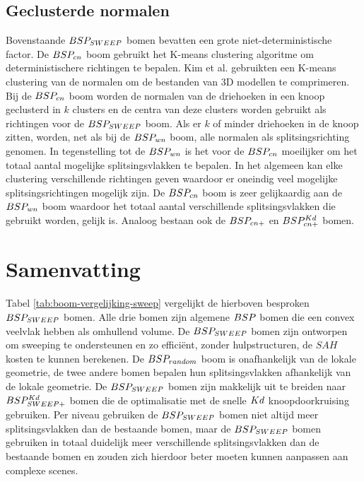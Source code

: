 
    

    
\subsection{Geclusterde normalen}
    Bovenstaande $BSP_{SWEEP}$ bomen bevatten een grote niet-deterministische factor.
    De $BSP_{cn}$ boom gebruikt het K-means clustering algoritme om deterministischere richtingen te bepalen.
    Kim et al. \cite{kim2002compression} gebruikten een K-means clustering van de normalen om de bestanden van 3D modellen te comprimeren.
    Bij de $BSP_{cn}$ boom worden de normalen van de driehoeken in een knoop geclusterd in $k$ clusters en de centra van deze clusters worden gebruikt als richtingen voor de $BSP_{SWEEP}$ boom.
    Als er $k$ of minder driehoeken in de knoop zitten, worden, net als bij de $BSP_{wn}$ boom, alle normalen als splitsingsrichting genomen.
    In tegenstelling tot de $BSP_{wn}$ is het voor de $BSP_{cn}$ moeilijker om het totaal aantal mogelijke splitsingsvlakken te bepalen.
    In het algemeen kan elke clustering verschillende richtingen geven waardoor er oneindig veel mogelijke splitsingsrichtingen mogelijk zijn.
    De $BSP_{cn}$ boom is zeer gelijkaardig aan de $BSP_{wn}$ boom waardoor het totaal aantal verschillende splitsingsvlakken die gebruikt worden, gelijk is. Analoog bestaan ook de $BSP_{cn+}$ en $BSP^{Kd}_{cn+}$ bomen.


\section{Samenvatting}
Tabel \ref{tab:boom-vergelijking-sweep} vergelijkt de hierboven besproken $BSP_{SWEEP}$ bomen.
Alle drie bomen zijn algemene $BSP$ bomen die een convex veelvlak hebben als omhullend volume.
De $BSP_{SWEEP}$ bomen zijn ontworpen om sweeping te ondersteunen en zo efficiënt, zonder hulpstructuren, de $SAH$ kosten te kunnen berekenen.
De $BSP_{random}$ boom is onafhankelijk van de lokale geometrie, de twee andere bomen bepalen hun splitsingsvlakken afhankelijk van de lokale geometrie.
De $BSP_{SWEEP}$ bomen zijn makkelijk uit te breiden naar $BSP^{Kd}_{SWEEP+}$ bomen die de optimalisatie met de snelle $Kd$ knoopdoorkruising gebruiken.
Per niveau gebruiken de $BSP_{SWEEP}$ bomen niet altijd meer splitsingsvlakken dan de bestaande bomen, maar de $BSP_{SWEEP}$ bomen gebruiken in totaal duidelijk meer verschillende splitsingsvlakken dan de bestaande bomen en zouden zich hierdoor beter moeten kunnen aanpassen aan complexe scenes.

